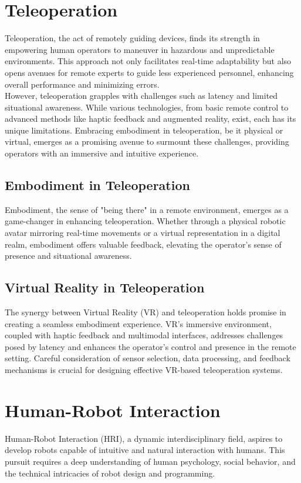 \documentclass{Configuration_Files/PoliMi3i_thesis}
\begin{document}
\section{Teleoperation}
Teleoperation, the act of remotely guiding devices, finds its strength in empowering human operators to maneuver in hazardous and unpredictable environments. This approach not only facilitates real-time adaptability but also opens avenues for remote experts to guide less experienced personnel, enhancing overall performance and minimizing errors.
\\However, teleoperation grapples with challenges such as latency and limited situational awareness. While various technologies, from basic remote control to advanced methods like haptic feedback and augmented reality, exist, each has its unique limitations. Embracing embodiment in teleoperation, be it physical or virtual, emerges as a promising avenue to surmount these challenges, providing operators with an immersive and intuitive experience.

\subsection{Embodiment in Teleoperation}
Embodiment, the sense of "being there" in a remote environment, emerges as a game-changer in enhancing teleoperation. Whether through a physical robotic avatar mirroring real-time movements or a virtual representation in a digital realm, embodiment offers valuable feedback, elevating the operator's sense of presence and situational awareness.

\subsection{Virtual Reality in Teleoperation}
The synergy between Virtual Reality (VR) and teleoperation holds promise in creating a seamless embodiment experience. VR's immersive environment, coupled with haptic feedback and multimodal interfaces, addresses challenges posed by latency and enhances the operator's control and presence in the remote setting. Careful consideration of sensor selection, data processing, and feedback mechanisms is crucial for designing effective VR-based teleoperation systems.

\section{Human-Robot Interaction}
Human-Robot Interaction (HRI), a dynamic interdisciplinary field, aspires to develop robots capable of intuitive and natural interaction with humans. This pursuit requires a deep understanding of human psychology, social behavior, and the technical intricacies of robot design and programming.
\end{document}
